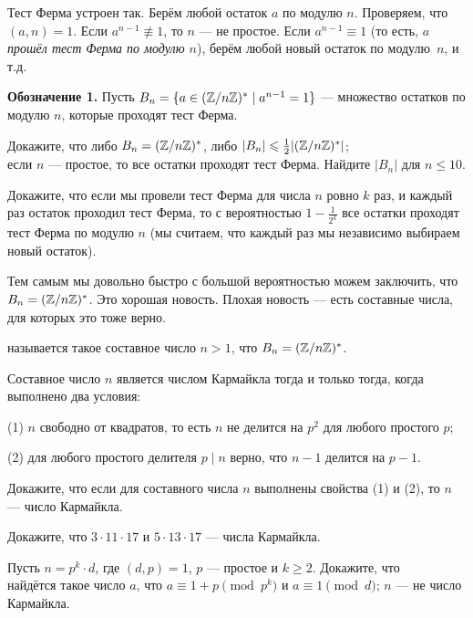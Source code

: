 \documentclass[a4paper,12pt]{article}
\begin{document}

{\footnotesize Тест Ферма устроен так. Берём любой остаток $a$ по модулю $n$. Проверяем, что $(a,n)=1$. Если $a^{n-1} \not\equiv 1$, то $n$ --- не простое. Если $a^{n-1} \equiv 1$ (то есть, $a$ {\it прошёл тест Ферма по модулю $n$}), берём любой новый остаток по модулю~$n$, и т.д.

}

\noindent
{\bf Обозначение 1.} Пусть $B_n = \{ a \in (\mathbb{Z}/n\mathbb{Z})^* \mid a^{n-1} = 1\}$ --- множество остатков по модулю $n$, которые проходят тест Ферма.

 Докажите, что  либо $B_n = (\mathbb{Z}/n\mathbb{Z})^*$, либо $|B_n| \leqslant \frac{1}{2} |(\mathbb{Z}/n\mathbb{Z})^*|$;\\
 если $n$ --- простое, то все остатки проходят тест Ферма.
 Найдите $|B_n|$ для $n \leq 10$.

 Докажите, что если мы провели тест Ферма для числа $n$ ровно $k$ раз, и каждый раз остаток проходил тест Ферма, то с вероятностью $1-\frac{1}{2^k}$ все остатки проходят тест Ферма по модулю $n$ (мы считаем, что каждый раз мы независимо выбираем новый остаток). 

{\footnotesize Тем самым мы довольно быстро с большой вероятностью можем заключить, что $B_n = (\mathbb{Z}/n\mathbb{Z})^*$. Это хорошая новость. Плохая новость --- есть составные числа, для которых это тоже верно.}

 называется такое составное число $n > 1$, что $B_n = (\mathbb{Z}/n\mathbb{Z})^*$.

\label{Carm} Составное число $n$ является числом Кармайкла тогда и только тогда, когда выполнено два условия:

(1) $n$ свободно от квадратов, то есть $n$ не делится на $p^2$ для любого простого $p$;

(2) для любого простого делителя $p \mid n$ верно, что $n-1$ делится на $p-1$.


 Докажите, что если для составного числа $n$ выполнены свойства (1) и (2), то $n$ --- число Кармайкла.

 Докажите, что $3\cdot 11 \cdot 17$ и $5 \cdot 13 \cdot 17$ --- числа Кармайкла.

 Пусть $n=p^k\cdot d$, где $(d,p)=1$, $p$ --- простое и $k \geq 2$. Докажите, что\\
 найдётся такое число $a$, что $a \equiv 1+p \pmod{p^k}$ и $ a \equiv 1 \pmod{d}$;   $n$ --- не число Кармайкла.
\end{document}

